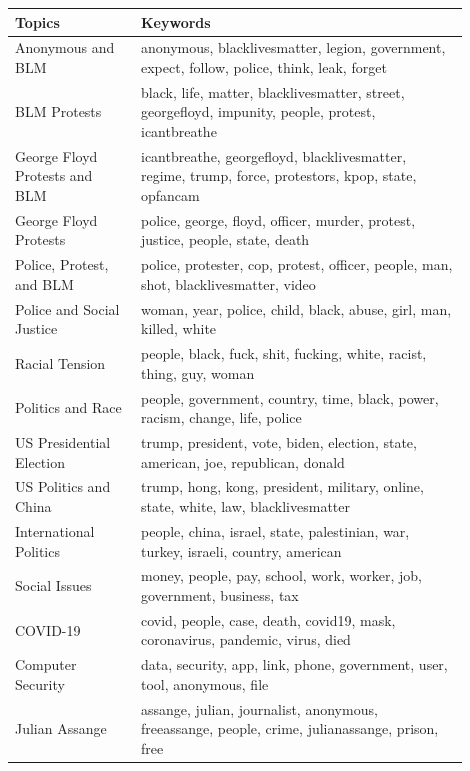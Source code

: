 \documentclass[letterpaper]{article}
\begin{document}
\begin{table}[!ht]
\footnotesize
\centering
\begin{tabular}{p{0.25\linewidth} >{\raggedright\arraybackslash}p{0.65\linewidth}}
\toprule
\textbf{Topics} & \textbf{Keywords} \\ [0.5ex]
\midrule
Anonymous and BLM & anonymous, blacklivesmatter, legion, government, expect, follow, police, think, leak, forget \\
\midrule
BLM Protests & black, life, matter, blacklivesmatter, street, georgefloyd, impunity, people, protest, icantbreathe \\
\midrule
George Floyd Protests and BLM & icantbreathe, georgefloyd, blacklivesmatter, regime, trump, force, protestors, kpop, state, opfancam \\
\midrule
George Floyd Protests & police, george, floyd, officer, murder, protest, justice, people, state, death \\
\midrule
Police, Protest, and BLM & police, protester, cop, protest, officer, people, man, shot, blacklivesmatter, video \\
\midrule
Police and Social Justice & woman, year, police, child, black, abuse, girl, man, killed, white \\
\midrule
Racial Tension & people, black, fuck, shit, fucking, white, racist, thing, guy, woman \\
\midrule
Politics and Race & people, government, country, time, black, power, racism, change, life, police \\
\midrule
US Presidential Election & trump, president, vote, biden, election, state, american, joe, republican, donald \\
\midrule
US Politics and China & trump, hong, kong, president, military, online, state, white, law, blacklivesmatter \\
\midrule
International Politics & people, china, israel, state, palestinian, war, turkey, israeli, country, american \\
\midrule
Social Issues & money, people, pay, school, work, worker, job, government, business, tax \\
\midrule
COVID-19 & covid, people, case, death, covid19, mask, coronavirus, pandemic, virus, died \\
\midrule
Computer Security & data, security, app, link, phone, government, user, tool, anonymous, file \\
\midrule
Julian Assange & assange, julian, journalist, anonymous, freeassange, people, crime, julianassange, prison, free \\

\end{tabular}
\end{table}
\end{document}
